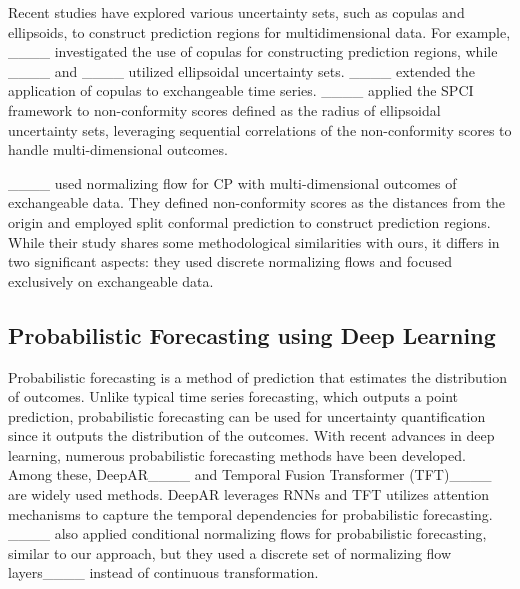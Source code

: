 Recent studies have explored various uncertainty sets, such as copulas and ellipsoids, to construct prediction regions for multidimensional data. For example, ____ investigated the use of copulas for constructing prediction regions, while ____ and ____ utilized ellipsoidal uncertainty sets. ____ extended the application of copulas to exchangeable time series. ____ applied the SPCI framework to non-conformity scores defined as the radius of ellipsoidal uncertainty sets, leveraging sequential correlations of the non-conformity scores to handle multi-dimensional outcomes.

____ used normalizing flow for CP with multi-dimensional outcomes of exchangeable data. They defined non-conformity scores as the distances from the origin and employed split conformal prediction to construct prediction regions. While their study shares some methodological similarities with ours, it differs in two significant aspects: they used discrete normalizing flows and focused exclusively on exchangeable data.


 
\subsection{Probabilistic Forecasting using Deep Learning}

Probabilistic forecasting is a method of prediction that estimates the distribution of outcomes. Unlike typical time series forecasting, which outputs a point prediction, probabilistic forecasting can be used for uncertainty quantification since it outputs the distribution of the outcomes. With recent advances in deep learning, numerous probabilistic forecasting methods have been developed. Among these, DeepAR____ and Temporal Fusion Transformer (TFT)____ are widely used methods. DeepAR leverages RNNs and TFT utilizes attention mechanisms to capture the temporal dependencies for probabilistic forecasting. ____ also applied conditional normalizing flows for probabilistic forecasting, similar to our approach, but they used a discrete set of normalizing flow layers____ instead of continuous transformation.